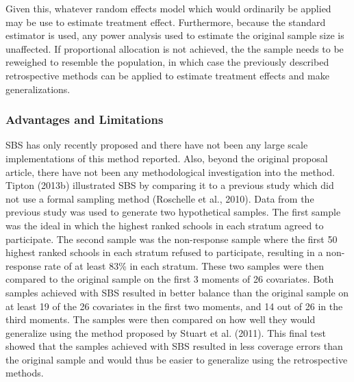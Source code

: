 \documentclass[man,floatsintext]{apa6}
\begin{document}
Given this, whatever random effects model which would ordinarily be applied may be use to estimate treatment effect. Furthermore, because the standard estimator is used, any power analysis used to estimate the original sample size is unaffected. If proportional allocation is not achieved, the the sample needs to be reweighed to resemble the population, in which case the previously described retrospective methods can be applied to estimate treatment effects and make generalizations.

\hypertarget{advantages-and-limitations}{%
\subsubsection{Advantages and Limitations}\label{advantages-and-limitations}}

SBS has only recently proposed and there have not been any large scale implementations of this method reported. Also, beyond the original proposal article, there have not been any methodological investigation into the method. Tipton (2013b) illustrated SBS by comparing it to a previous study which did not use a formal sampling method (Roschelle et al., 2010). Data from the previous study was used to generate two hypothetical samples. The first sample was the ideal in which the highest ranked schools in each stratum agreed to participate. The second sample was the non-response sample where the first 50 highest ranked schools in each stratum refused to participate, resulting in a non-response rate of at least 83\% in each stratum. These two samples were then compared to the original sample on the first 3 moments of 26 covariates. Both samples achieved with SBS resulted in better balance than the original sample on at least 19 of the 26 covariates in the first two moments, and 14 out of 26 in the third moments. The samples were then compared on how well they would generalize using the method proposed by Stuart et al. (2011). This final test showed that the samples achieved with SBS resulted in less coverage errors than the original sample and would thus be easier to generalize using the retrospective methods.
\end{document}
